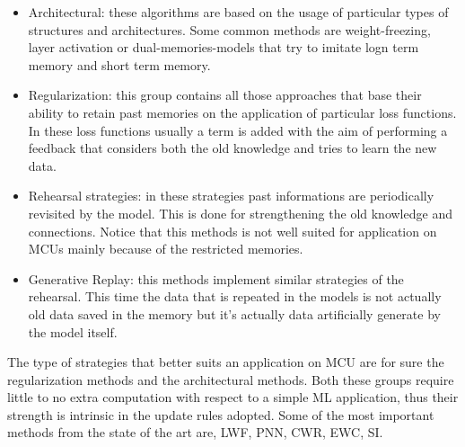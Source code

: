 \documentclass[12pt]{report}
\begin{document}
\begin{itemize}
\item Architectural: these algorithms are based on the usage of particular types of structures and architectures. Some common methods are weight-freezing, layer activation or dual-memories-models that try to imitate logn term memory and short term memory.
\item Regularization: this group contains all those approaches that base their ability to retain past memories on the application of particular loss functions. In these loss functions usually a term is added with the aim of performing a feedback that considers both the old knowledge and tries to learn the new data.
\item Rehearsal strategies: in these strategies past informations are periodically revisited by the model. This is done for strengthening the old knowledge and connections. Notice that this methods is not well suited for application on MCUs mainly because of the restricted memories. 
\item Generative Replay: this methods implement similar strategies of the rehearsal. This time the data that is repeated in the models is not actually old data saved in the memory but it's actually data artificially generate by the model itself. 
\end{itemize} 

The type of strategies that better suits an application on MCU are for sure the regularization methods and the architectural methods. Both these groups require little to no extra computation with respect to a simple ML application, thus their strength is intrinsic in the update rules adopted. Some of the most important methods from the state of the art are, LWF, PNN, CWR, EWC, SI. 
\end{document}
